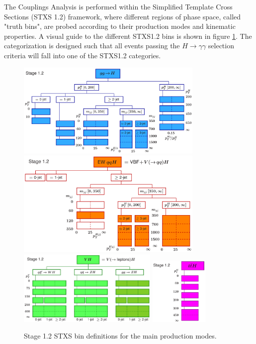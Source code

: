 The Couplings Analysis is performed within the Simplified Template Cross Sections (STXS 1.2) framework, where different regions of phase space, called "truth bins", are probed according to their production modes and kinematic properties. A visual guide to the different STXS1.2 bins is shown in figure \ref{fig:STXS_scheme}. The categorization is designed such that all events passing the $H \rightarrow \gamma \gamma$ selection criteria will fall into one of the STXS1.2 categories.

\begin{figure}[tbp]
  \centering
  \includegraphics[width=0.8\textwidth]{figures/theory_chapter/simplifiedXS_ggF_1_2} \\[3mm]
  \includegraphics[width=0.8\textwidth]{figures/theory_chapter/simplifiedXS_VBF_1_2} \\[3mm]
  \includegraphics[width=0.6\textwidth]{figures/theory_chapter/simplifiedXS_VH_1_2}
  \includegraphics[width=0.25\textwidth]{figures/theory_chapter/simplifiedXS_ttH_1_2}
  \caption{Stage 1.2 STXS bin definitions for the main production modes.}
  \label{fig:STXS_scheme}
\end{figure}


